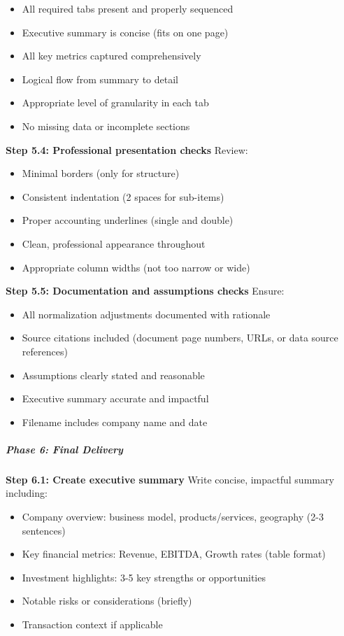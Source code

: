\documentclass[11pt]{article}
\begin{document}
\begin{itemize}[leftmargin=*,itemsep=2pt,topsep=2pt]
\item {} All required tabs present and properly sequenced
\item {} Executive summary is concise (fits on one page)
\item {} All key metrics captured comprehensively
\item {} Logical flow from summary to detail
\item {} Appropriate level of granularity in each tab
\item {} No missing data or incomplete sections
\end{itemize}

\textbf{Step 5.4: Professional presentation checks} Review:

\begin{itemize}[leftmargin=*,itemsep=2pt,topsep=2pt]
\item {} Minimal borders (only for structure)
\item {} Consistent indentation (2 spaces for sub-items)
\item {} Proper accounting underlines (single and double)
\item {} Clean, professional appearance throughout
\item {} Appropriate column widths (not too narrow or wide)
\end{itemize}

\textbf{Step 5.5: Documentation and assumptions checks} Ensure:

\begin{itemize}[leftmargin=*,itemsep=2pt,topsep=2pt]
\item {} All normalization adjustments documented with rationale
\item {} Source citations included (document page numbers, URLs, or data source references)
\item {} Assumptions clearly stated and reasonable
\item {} Executive summary accurate and impactful
\item {} Filename includes company name and date
\end{itemize}

\subparagraph{Phase 6: Final Delivery}\mbox{}\par

\textbf{Step 6.1: Create executive summary} Write concise, impactful summary including:

\begin{itemize}[leftmargin=*,itemsep=2pt,topsep=2pt]
\item {} Company overview: business model, products/services, geography (2-3 sentences)
\item {} Key financial metrics: Revenue, EBITDA, Growth rates (table format)
\item {} Investment highlights: 3-5 key strengths or opportunities
\item {} Notable risks or considerations (briefly)
\item {} Transaction context if applicable
\end{itemize}
\end{document}

